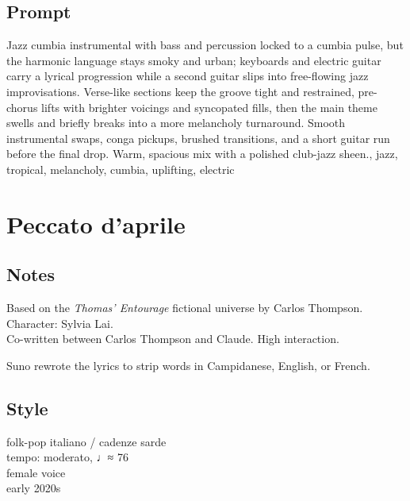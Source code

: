 \subsection{Prompt}
Jazz cumbia instrumental with bass and percussion locked to a cumbia pulse, but the harmonic language stays smoky and urban; keyboards and electric guitar carry a lyrical progression while a second guitar slips into free-flowing jazz improvisations. Verse-like sections keep the groove tight and restrained, pre-chorus lifts with brighter voicings and syncopated fills, then the main theme swells and briefly breaks into a more melancholy turnaround. Smooth instrumental swaps, conga pickups, brushed transitions, and a short guitar run before the final drop. Warm, spacious mix with a polished club-jazz sheen., jazz, tropical, melancholy, cumbia, uplifting, electric

\sepbar

\section{Peccato d'aprile}

\subsection{Notes}
Based on the \emph{Thomas' Entourage} fictional universe by Carlos Thompson.\\
Character: Sylvia Lai.\\
Co-written between Carlos Thompson and Claude. High interaction.

Suno rewrote the lyrics to strip words in Campidanese, English, or French.

\subsection{Style}
folk-pop italiano / cadenze sarde\\
tempo: moderato, ♩≈ 76\\
female voice\\
early 2020s

